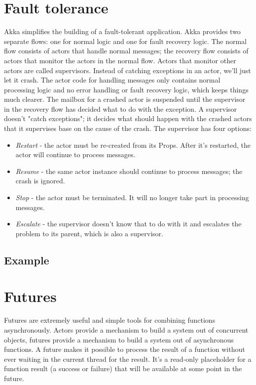 \documentclass{article}
\begin{document}
\section{Fault tolerance}
Akka simplifies the building of a fault-tolerant application.
Akka provides two separate flows: one for normal logic and one for fault recovery logic. The normal flow consists of actors that handle normal messages; the recovery flow consists of actors that monitor the actors in the normal flow. Actors that monitor other actors are called supervisors. Instead of catching exceptions in an actor, we'll just let it crash. The actor code for handling messages only contains normal processing logic and no error handling or fault recovery logic, which keeps things much clearer. The mailbox for a crashed actor is suspended until the supervisor in the recovery flow has decided what to do with the exception. A supervisor doesn't "catch exceptions"; it decides what should happen with the crashed actors that it supervises base on the cause of the crash. The supervisor has four options:
\begin{itemize}
\item \textit{Restart} - the actor must be re-created from its Props. After it's restarted, the actor will continue to process messages.
\item \textit{Resume} - the same actor instance should continue to process messages; the crash is ignored.
\item \textit{Stop} - the actor must be terminated. It will no longer take part in processing messages.
\item \textit{Escalate} - the supervisor doesn't know that to do with it and escalates the problem to its parent, which is also a supervisor.
\end{itemize}

\subsection{Example}

\vskip 1cm



\section{Futures}
Futures are extremely useful and simple tools for combining functions asynchronously. Actors provide a mechanism to build a system out of concurrent objects, futures provide a mechanism to build a system out of asynchronous functions.
A future makes it possible to process the result of a function without ever waiting in the current thread for the result. It's a read-only placeholder for a function result (a success or failure) that will be available at some point in the future.
\end{document}
